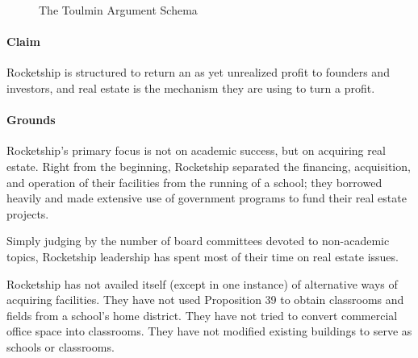 \begin{figure}[ht]
  \caption{The Toulmin Argument Schema}%
  \label{fig:toulmin-arg}%
\end{figure}

\paragraph{Claim}
Rocketship is structured to return an as yet unrealized profit to founders and investors, and real estate is the mechanism they are using to turn a profit.
\paragraph{Grounds}
Rocketship's primary focus is not on academic success, but on acquiring real estate. Right from the beginning, Rocketship separated the financing, acquisition, and operation of their facilities from the running of a school; they borrowed heavily and made extensive use of government programs to fund their real estate projects.

Simply judging by the number of board committees devoted to non-academic topics, Rocketship leadership has spent most of their time on real estate issues.

Rocketship has not availed itself (except in one instance) of alternative ways of acquiring facilities. They have not used Proposition 39 to obtain classrooms and fields from a school's home district. They have not tried to convert commercial office space into classrooms. They have not modified existing buildings to serve as schools or classrooms.

